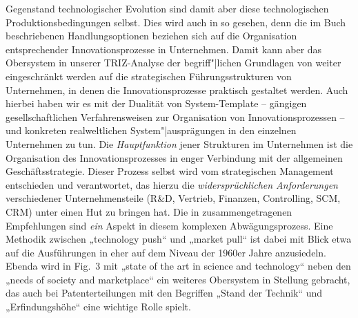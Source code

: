 \documentclass[11pt,a4paper]{article}
\begin{document}
Gegenstand technologischer Evolution sind damit aber diese technologischen
Produktionsbedingungen selbst. Dies wird auch in \cite{TESE2018} so gesehen,
denn die im Buch beschriebenen Handlungsoptionen beziehen sich auf die
Organisation entsprechender Innovationsprozesse in Unternehmen. Damit kann
aber das Obersystem in unserer TRIZ-Analyse der begriff"|lichen Grundlagen von
\cite{TESE2018} weiter eingeschränkt werden auf die strategischen
Führungsstrukturen von Unternehmen, in denen die Innovationsprozesse praktisch
gestaltet werden. Auch hierbei haben wir es mit der Dualität von
System-Template -- gängigen gesellschaftlichen Verfahrensweisen zur
Organisation von Innovationsprozessen -- und konkreten realweltlichen
System"|ausprägungen in den einzelnen Unternehmen zu tun. Die
\emph{Hauptfunktion} jener Strukturen im Unternehmen ist die Organisation des
Innovationsprozesses in enger Verbindung mit der allgemeinen
Geschäftsstrategie.  Dieser Prozess selbst wird vom strategischen Management
entschieden und verantwortet, das hierzu die \emph{widersprüchlichen
  Anforderungen} verschiedener Unternehmensteile (R\&D, Vertrieb, Finanzen,
Controlling, SCM, CRM) unter einen Hut zu bringen hat. Die in \cite{TESE2018}
zusammengetragenen Empfehlungen sind \emph{ein} Aspekt in diesem komplexen
Abwägungsprozess. Eine Methodik zwischen „technology push“ und „market pull“
ist dabei mit Blick etwa auf die Ausführungen in \cite{Preez2006} eher auf dem
Niveau der 1960er Jahre anzusiedeln. Ebenda wird in Fig.~3 mit „state of the
art in science and technology“ neben den „needs of society and marketplace“
ein weiteres Obersystem in Stellung gebracht, das auch bei Patenterteilungen
mit den Begriffen „Stand der Technik“ und „Erfindungshöhe“ eine wichtige Rolle
spielt.
\end{document}
